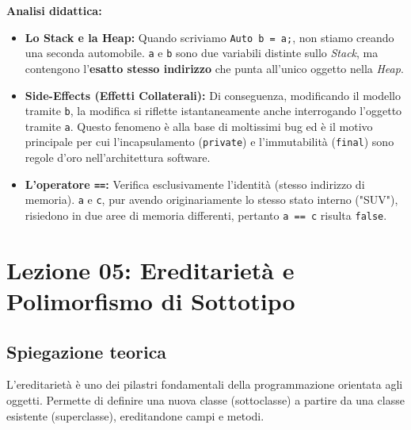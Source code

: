 \documentclass[12pt, a4paper]{article}
\begin{document}
\textbf{Analisi didattica:}
\begin{itemize}
    \item \textbf{Lo Stack e la Heap:} Quando scriviamo \texttt{Auto b = a;}, non stiamo creando una seconda automobile. \texttt{a} e \texttt{b} sono due variabili distinte sullo \textit{Stack}, ma contengono l'\textbf{esatto stesso indirizzo} che punta all'unico oggetto nella \textit{Heap}.
    \item \textbf{Side-Effects (Effetti Collaterali):} Di conseguenza, modificando il modello tramite \texttt{b}, la modifica si riflette istantaneamente anche interrogando l'oggetto tramite \texttt{a}. Questo fenomeno è alla base di moltissimi bug ed è il motivo principale per cui l'incapsulamento (\texttt{private}) e l'immutabilità (\texttt{final}) sono regole d'oro nell'architettura software.
    \item \textbf{L'operatore \texttt{==}:} Verifica esclusivamente l'identità (stesso indirizzo di memoria). \texttt{a} e \texttt{c}, pur avendo originariamente lo stesso stato interno ("SUV"), risiedono in due aree di memoria differenti, pertanto \texttt{a == c} risulta \texttt{false}.
\end{itemize}


\section{Lezione 05: Ereditarietà e Polimorfismo di Sottotipo}

\subsection{Spiegazione teorica}
L'ereditarietà è uno dei pilastri fondamentali della programmazione orientata agli oggetti. Permette di definire una nuova classe (sottoclasse) a partire da una classe esistente (superclasse), ereditandone campi e metodi.
\end{document}
